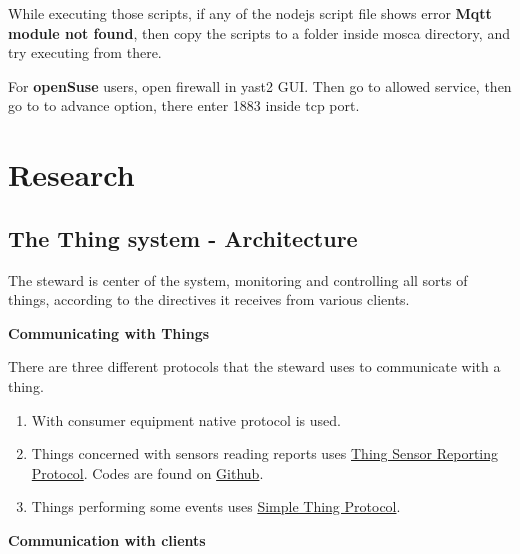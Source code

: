 \documentclass[16pt]{article}
\begin{document}
While executing those scripts, if any of the nodejs script file shows
error \textbf{Mqtt module not found}, then copy the scripts to a folder
inside mosca directory, and try executing from there.

For \textbf{openSuse} users, open firewall in yast2 GUI. Then go to
allowed service, then go to to advance option, there enter 1883 inside
tcp port.

  
\vspace{8cm}

\section{Research}
\vspace{0.5cm}



\subsection{The Thing system - Architecture}

\vspace{0.5cm}

The steward is center of the system, monitoring and controlling all
sorts of things, according to the directives it receives from various
clients.
\vspace{0.5cm}

{\Large{\textbf{Communicating with
Things}}}

There are three different protocols that the steward uses to communicate
with a thing. 

\begin{enumerate}


\item With consumer equipment native protocol is used.
\item Things concerned with sensors reading reports uses
\href{http://thethingsystem.com/dev/Thing-Sensor-Reporting-Protocol.html}{Thing
Sensor Reporting Protocol}.
Codes are found on
\href{https://github.com/TheThingSystem/steward/tree/master/things/examples}{Github}.
\item Things performing some events uses
\href{http://thethingsystem.com/dev/Simple-Thing-Protocol.html}{Simple Thing Protocol}.

\end{enumerate}

\vspace{0.5cm}

{\Large{\textbf{Communication with
clients}}}
\end{document}
